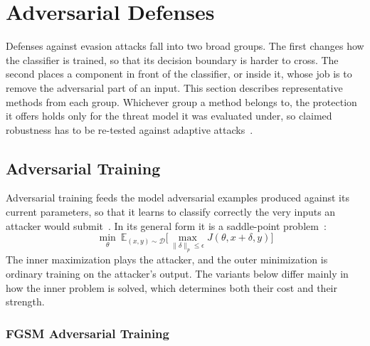 \documentclass[12pt]{article}
\begin{document}
\section{Adversarial Defenses}

Defenses against evasion attacks fall into two broad groups. The first changes how the classifier is trained, so that its decision boundary is harder to cross. The second places a component in front of the classifier, or inside it, whose job is to remove the adversarial part of an input. This section describes representative methods from each group. Whichever group a method belongs to, the protection it offers holds only for the threat model it was evaluated under, so claimed robustness has to be re-tested against adaptive attacks~\cite{carlini2019,athalye2018}.

\subsection{Adversarial Training}

Adversarial training feeds the model adversarial examples produced against its current parameters, so that it learns to classify correctly the very inputs an attacker would submit~\cite{szegedy2014,goodfellow2015}. In its general form it is a saddle-point problem~\cite{madry2018}:
\begin{equation}
  \min_{\theta}\ \mathbb{E}_{(x,y)\sim\mathcal{D}}\Big[\max_{\lVert\delta\rVert_p \le \epsilon} J(\theta, x+\delta, y)\Big]
\end{equation}
The inner maximization plays the attacker, and the outer minimization is ordinary training on the attacker's output. The variants below differ mainly in how the inner problem is solved, which determines both their cost and their strength.

\subsubsection{FGSM Adversarial Training}
\end{document}

